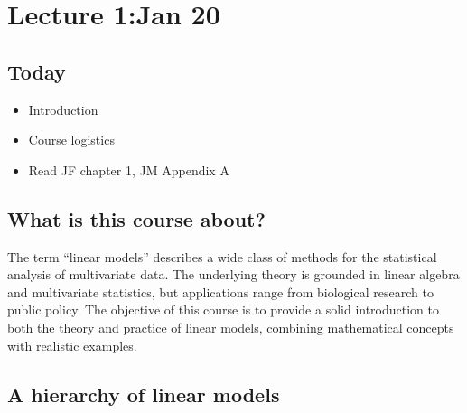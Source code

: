 \section{Lecture 1:Jan 20}

\subsection*{Today}
\begin{itemize}
\item Introduction
\item Course logistics
\item Read JF chapter 1, JM Appendix A
\end{itemize}

\subsection*{What is this course about?}
The term “linear models” describes a wide class of methods for the statistical analysis of multivariate data.
The underlying theory is grounded in linear algebra and multivariate statistics, but applications range from biological research to public policy.
The objective of this course is to provide a solid introduction to both the theory and practice of linear models, combining mathematical concepts with realistic examples.

\subsection*{A hierarchy of linear models}

